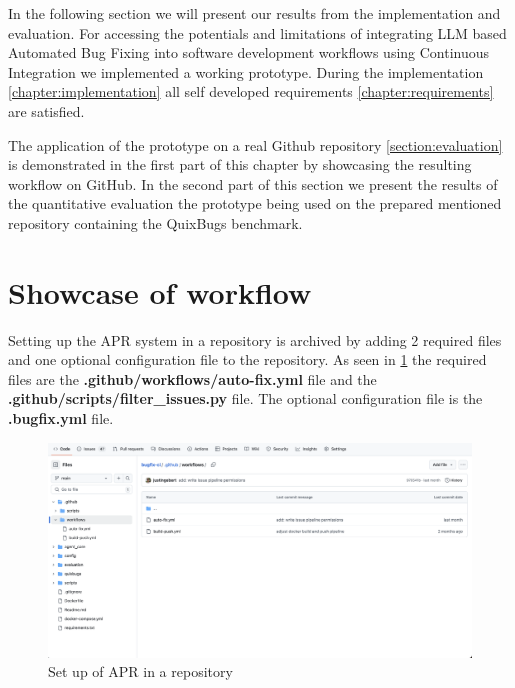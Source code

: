 In the following section we will present our results from the implementation and evaluation. For accessing the potentials and limitations of integrating LLM based Automated Bug Fixing into software development workflows using Continuous Integration we implemented a working prototype. During the implementation \ref{chapter:implementation} all self developed requirements \ref{chapter:requirements} are satisfied.

The application of the prototype on a real Github repository \ref{section:evaluation} is demonstrated in the first part of this chapter by showcasing the resulting workflow on GitHub. In the second part of this section we  present the results of the quantitative evaluation the prototype being used on the prepared mentioned repository containing the QuixBugs benchmark.

\section{Showcase of workflow} \label{section:showcase}
Setting up the APR system in a repository is archived by adding 2 required files and one optional configuration file to the repository. As seen in \ref{fig:setup} the required files are the \textbf{.github/workflows/auto-fix.yml} file and the \textbf{.github/scripts/filter\_issues.py} file. The optional configuration file is the \textbf{.bugfix.yml} file.

\begin{figure}[H]
    \centering
    \includegraphics[width=1\textwidth]{images/workflow/setup.png}
    \caption{Set up of APR in a repository}
    \label{fig:setup}
\end{figure}

